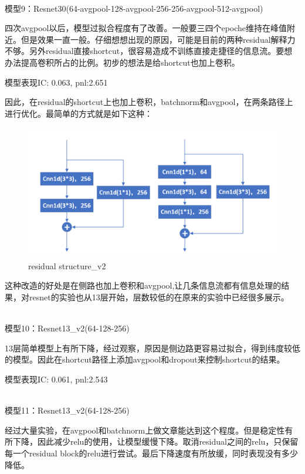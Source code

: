 \documentclass[11pt]{ctexart}
\begin{document}
~\\
模型9：Resnet30(64-avgpool-128-avgpool-256-256-avgpool-512-avgpool)

四次avgpool以后，模型过拟合程度有了改善。一般要三四个epoche维持在峰值附近。但是效果一直一般。仔细想想出现的原因，可能是目前的两种residual解释力不够。另外residual直接shortcut，很容易造成不训练直接走捷径的信息流。要想办法提高卷积所占的比例。初步的想法是给shortcut也加上卷积。

模型表现{\kaishu \small IC: 0.063, pnl:2.651}

因此，在residual的shortcut上也加上卷积，batchnorm和avgpool，在两条路径上进行优化。最简单的方式就是如下这种：

\begin{figure}[H]

\begin{center}
\includegraphics[width=1.0\textwidth]{residual3.PNG}
\end{center}
\caption{residual structure\_v2}
\label{FIG.3}
\end{figure}

这种改造的好处是在侧路也加上卷积和avgpool,让几条信息流都有信息处理的结果，对resnet的实验也从13层开始，层数较低的在原来的实验中已经很多展示。

~\\
模型10：Resnet13\_v2(64-128-256)

13层简单模型上有所下降，经过观察，原因是侧边路更容易过拟合，得到纬度较低的模型。因此在shortcut路径上添加avgpool和dropout来控制shortcut的结果。

模型表现{\kaishu \small IC: 0.061, pnl:2.543}

~\\
模型11：Resnet13\_v2(64-128-256)

经过大量实验，在avgpool和batchnorm上做文章能达到这个程度。但是稳定性有所下降，因此减少relu的使用，让模型缓慢下降。取消residual之间的relu，只保留每一个residual  block的relu进行尝试。最后下降速度有所放缓，同时表现没有多少降低。
\end{document}
